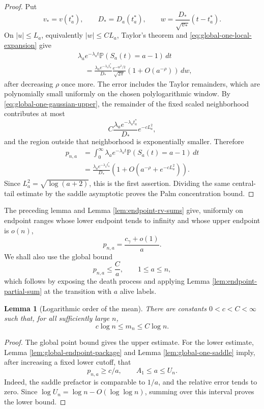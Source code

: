\documentclass[11pt]{article}
\newtheorem{lemma}[theorem]{Lemma}
\theoremstyle{remark}
\newcommand{\Pp}{\mathbb P}
\newcommand{\dd}{\,d}
\begin{document}
\begin{proof}
Put
\[
        v_*=v(t_a^*),
        \qquad D_*=D_a(t_a^*),
        \qquad
        w=\frac{D_*}{\sqrt{v_*}}(t-t_a^*).
\]
On $|u|\le L_a$, equivalently $|w|\le C L_a$, Taylor's theorem and
\eqref{eq:global-one-local-expansion} give
\[
\begin{aligned}
&\lambda_ae^{-\lambda_at}
 \Pp(S_a(t)=a-1)\dd t\\
&\quad=\frac{\lambda_ae^{-\lambda_at_a^*}}{D_*}
        \frac{e^{-w^2/2}}{\sqrt{2\pi}}
        \left(1+O(a^{-\rho})\right)\dd w,
\end{aligned}
\]
after decreasing $\rho$ once more.  The error includes the Taylor remainders,
which are polynomially small uniformly on the chosen polylogarithmic window.
By \eqref{eq:global-one-gaussian-upper}, the remainder of the fixed scaled
neighborhood contributes at most
\[
        C\frac{\lambda_ae^{-\lambda_at_a^*}}{D_*}e^{-cL_a^2},
\]
and the region outside that neighborhood is exponentially smaller.  Therefore
\[
\begin{aligned}
        p_{n,a}
        &=\int_0^\infty \lambda_ae^{-\lambda_at}
        \Pp(S_a(t)=a-1)\dd t\\
        &=\frac{\lambda_ae^{-\lambda_at_a^*}}{D_*}
        \left(1+O\left(a^{-\rho}+e^{-cL_a^2}\right)\right).
\end{aligned}
\]
Since $L_a^2=\sqrt{\log(a+2)}$, this is the first assertion.  Dividing the
same central-tail estimate by the saddle asymptotic proves the Palm
concentration bound.
\end{proof}

The preceding lemma and Lemma \ref{lem:endpoint-rv-sums} give, uniformly on
endpoint ranges whose lower endpoint tends to infinity and whose upper endpoint
is $o(n)$,
\[
        p_{n,a}=\frac{c_\gamma+o(1)}{a}.
\]
We shall also use the global bound
\[
        p_{n,a}\le\frac{C}{a},
        \qquad 1\le a\le n,
\]
which follows by exposing the death process and applying Lemma
\ref{lem:endpoint-partial-sum} at the transition with $a$ alive labels.

\begin{lemma}[Logarithmic order of the mean]\label{lem:global-mean-order}
There are constants $0<c<C<\infty$ such that, for all sufficiently large $n$,
\[
        c\log n\le m_n\le C\log n.
\]
\end{lemma}

\begin{proof}
The global point bound gives the upper estimate.  For the lower estimate,
Lemma \ref{lem:global-endpoint-package} and Lemma
\ref{lem:global-one-saddle} imply, after increasing a fixed lower cutoff, that
\[
        p_{n,a}\ge c/a,
        \qquad A_1\le a\le U_n.
\]
Indeed, the saddle prefactor is comparable to $1/a$, and the relative error
tends to zero.  Since
$\log U_n=\log n-O(\log\log n)$, summing over this interval proves the lower
bound.
\end{proof}
\end{document}
